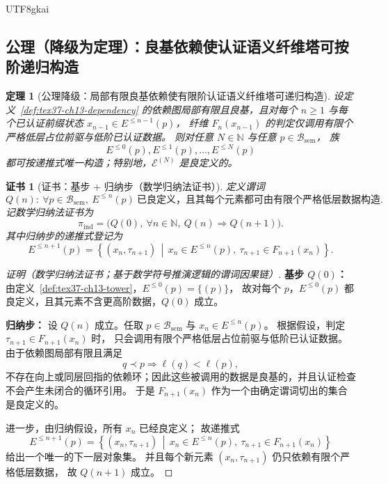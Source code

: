 \documentclass[12pt]{article}
\newtheorem{theorem}{定理}[section]
\newtheorem{Certificate}{证书}[section]
\newcommand{\NN}{\mathbb{N}}
\begin{document}
\begin{CJK*}{UTF8}{gkai}
\subsection{公理（降级为定理）：良基依赖使认证语义纤维塔可按阶递归构造}
\label{subsec:tex37-ch13-recursion}

\begin{theorem}[公理降级：局部有限良基依赖使有限阶认证语义纤维塔可递归构造]
\label{thm:tex37-ch13-recursion}
设定义~\ref{def:tex37-ch13-dependency} 的依赖图局部有限且良基，且对每个 $n\ge 1$ 与每个已认证前缀状态 $x_{n-1}\in E^{\le n-1}(p)$，
纤维 $F_n(x_{n-1})$ 的判定仅调用有限个严格低层占位前驱与低阶已认证数据。
则对任意 $N\in\NN$ 与任意 $p\in\mathcal B_{\mathrm{sem}}$，
族
\[
  E^{\le 0}(p),E^{\le 1}(p),\dots,E^{\le N}(p)
\]
都可按递推式唯一构造；特别地，$\mathcal E^{(N)}$ 是良定义的。
\end{theorem}

\begin{Certificate}[证书：基步 + 归纳步（数学归纳法证书）]
\label{cert:tex37-ch13-recursion}
定义谓词
\[
  Q(n):\ \forall p\in\mathcal B_{\mathrm{sem}},\ E^{\le n}(p)\ \text{已良定义，且其每个元素都可由有限个严格低层数据构造}.
\]
记数学归纳法证书为
\[
  \pi_{\mathrm{ind}}
  =
  \bigl(Q(0),\ \forall n\in\NN,\ Q(n)\Rightarrow Q(n+1)\bigr).
\]
其中归纳步的递推式登记为
\[
  E^{\le n+1}(p)
  =
  \left\{
    (x_n,\tau_{n+1})
    \,\middle|\,
    x_n\in E^{\le n}(p),\ \tau_{n+1}\in F_{n+1}(x_n)
  \right\}.
\]
\end{Certificate}

\begin{proof}[证明（数学归纳法证书；基于数学符号推演逻辑的谓词因果链）]
\textbf{基步 $Q(0)$：}
由定义~\ref{def:tex37-ch13-tower}，$E^{\le 0}(p)=\{(p)\}$，
故对每个 $p$，$E^{\le 0}(p)$ 都良定义，且其元素不含更高阶数据，$Q(0)$ 成立。

\textbf{归纳步：}
设 $Q(n)$ 成立。任取 $p\in\mathcal B_{\mathrm{sem}}$ 与 $x_n\in E^{\le n}(p)$。
根据假设，判定 $\tau_{n+1}\in F_{n+1}(x_n)$ 时，
只会调用有限个严格低层占位前驱与低阶已认证数据。
由于依赖图局部有限且满足
\[
  q\prec p \Rightarrow \ell(q)<\ell(p),
\]
不存在向上或同层回指的依赖环；因此这些被调用的数据是良基的，并且认证检查不会产生未闭合的循环引用。
于是 $F_{n+1}(x_n)$ 作为一个由确定谓词切出的集合是良定义的。

进一步，由归纳假设，所有 $x_n$ 已经良定义；
故递推式
\[
  E^{\le n+1}(p)
  =
  \left\{
    (x_n,\tau_{n+1})
    \,\middle|\,
    x_n\in E^{\le n}(p),\ \tau_{n+1}\in F_{n+1}(x_n)
  \right\}
\]
给出一个唯一的下一层对象集。
并且每个新元素 $(x_n,\tau_{n+1})$ 仍只依赖有限个严格低层数据，
故 $Q(n+1)$ 成立。


\end{proof}
\end{CJK*}
\end{document}
